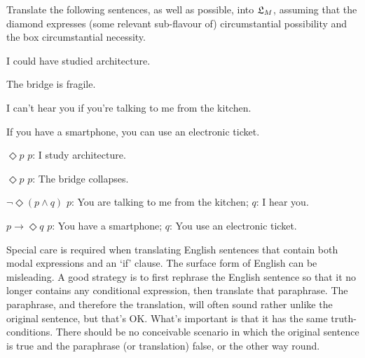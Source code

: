 \begin{exercise}
  Translate the following sentences, as well as possible, into $\mathfrak{L}_{M}$, assuming
  that the diamond expresses (some relevant sub-flavour of) circumstantial
  possibility and the box circumstantial necessity.
  \begin{exlist}
  \item I could have studied architecture.
  \item The bridge is fragile.
  \item I can't hear you if you're talking to me from the kitchen. 
  \item If you have a smartphone, you can use an electronic ticket.
    
  \end{exlist} 
\end{exercise}
\begin{solution}
  \begin{sollist}
    \item $\Diamond p$ \quad  $p$: I study architecture.
    \item $\Diamond p$ \quad  $p$: The bridge collapses.
    \item $\neg\Diamond(p \land q)$ \quad  $p$: You are talking to me from the kitchen; $q$: I hear you.
    \item $p \to \Diamond q$ \quad $p$: You have a smartphone; $q$: You use an electronic ticket.
  \end{sollist}
\end{solution}


Special care is required when translating English sentences that contain both
modal expressions and an `if' clause. The surface form of English can be
misleading. A good strategy is to first rephrase the English sentence so that it
no longer contains any conditional expression, then translate that paraphrase.
The paraphrase, and therefore the translation, will often sound rather unlike
the original sentence, but that's OK. What's important is that it has the same
truth-conditions. There should be no conceivable scenario in which the original
sentence is true and the paraphrase (or translation) false, or the other way
round.

